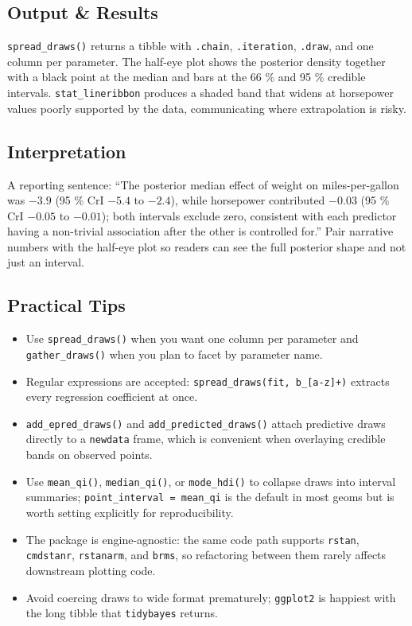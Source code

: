 \documentclass[
]{article}
\providecommand{\tightlist}{%
  \setlength{\itemsep}{0pt}\setlength{\parskip}{0pt}}
\begin{document}
\subsection{Output \& Results}\label{output-results}

\texttt{spread\_draws()} returns a tibble with \texttt{.chain},
\texttt{.iteration}, \texttt{.draw}, and one column per parameter. The
half-eye plot shows the posterior density together with a black point at
the median and bars at the 66 \% and 95 \% credible intervals.
\texttt{stat\_lineribbon} produces a shaded band that widens at
horsepower values poorly supported by the data, communicating where
extrapolation is risky.

\subsection{Interpretation}\label{interpretation}

A reporting sentence: ``The posterior median effect of weight on
miles-per-gallon was \(-3.9\) (95 \% CrI \(-5.4\) to \(-2.4\)), while
horsepower contributed \(-0.03\) (95 \% CrI \(-0.05\) to \(-0.01\));
both intervals exclude zero, consistent with each predictor having a
non-trivial association after the other is controlled for.'' Pair
narrative numbers with the half-eye plot so readers can see the full
posterior shape and not just an interval.

\subsection{Practical Tips}\label{practical-tips}

\begin{itemize}
\tightlist
\item
  Use \texttt{spread\_draws()} when you want one column per parameter
  and \texttt{gather\_draws()} when you plan to facet by parameter name.
\item
  Regular expressions are accepted:
  \texttt{spread\_draws(fit,\ b\_{[}a-z{]}+)} extracts every regression
  coefficient at once.
\item
  \texttt{add\_epred\_draws()} and \texttt{add\_predicted\_draws()}
  attach predictive draws directly to a \texttt{newdata} frame, which is
  convenient when overlaying credible bands on observed points.
\item
  Use \texttt{mean\_qi()}, \texttt{median\_qi()}, or
  \texttt{mode\_hdi()} to collapse draws into interval summaries;
  \texttt{point\_interval\ =\ mean\_qi} is the default in most geoms but
  is worth setting explicitly for reproducibility.
\item
  The package is engine-agnostic: the same code path supports
  \texttt{rstan}, \texttt{cmdstanr}, \texttt{rstanarm}, and
  \texttt{brms}, so refactoring between them rarely affects downstream
  plotting code.
\item
  Avoid coercing draws to wide format prematurely; \texttt{ggplot2} is
  happiest with the long tibble that \texttt{tidybayes} returns.
\end{itemize}
\end{document}
